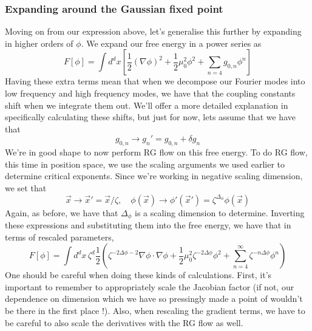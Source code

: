 \subsubsection{Expanding around the Gaussian fixed point}
Moving on from our expression above,
let's generalise this further by expanding 
in higher orders of $ \phi $. 
We expand our free energy in a power series as
 \[
	 F [ \phi ]  = \int d ^ d x \left[ \frac{1}{2 } ( \nabla \phi ) ^ 2 + 
	 \frac{1}{2 } \mu ^ 2 _ 0 \phi ^ 2 + \sum_{ n = 4 } g_{ 0 , n } \phi ^ n \right]  
\]  Having these
extra terms mean that when we decompose our 
Fourier modes into low frequency and 
high frequency modes, we have that 
the coupling constants shift when we integrate them out. 
We'll offer a more detailed explanation in 
specifically calculating these shifts, but just for now, 
lets assume that we have that 
\[
 g _{ 0 , n } \to g_{ n } ' = g _{ 0 , n } + \delta g _{ n }
\] We're in good shape to now 
perform RG flow on this free energy. To do RG flow, 
this time in position space, we use the scaling arguments 
we used earlier to determine critical exponents. 
Since we're working in negative scaling dimension, 
we set that 
\[
 \vec{x} \to \vec{x} ' = \vec{x}/\zeta, \quad 
 \phi( \vec{x} ) \to \phi ' ( \vec{x} ' )  = \zeta ^{ \Delta_ \phi  }
 \phi ( \vec{x} ) 
\] Again, as before, we have that 
$ \Delta _{ \phi } $ is a scaling 
dimension to determine. 
Inverting these expressions and substituting them into the free energy, we have that in terms of rescaled parameters, 
\[
 F [ \phi ] = 
 \int d ^ d x \, \zeta ^{ d } \frac{1}{2 } 
\left(  \zeta ^{ - 2 \Delta \phi - 2 } \nabla \phi \cdot  \nabla \phi + 
\frac{1}{2 } \mu _ 0 ^ 2 \zeta ^{ - 2 \Delta \phi  } \phi ^ 2 + 
\sum_{ n = 4 } ^ \infty \zeta ^{ - n \Delta \phi } \phi ^{ n } \right)  \] One should be careful 
when doing these kinds of calculations. 
First, it's important to remember to appropriately 
scale the Jacobian factor (if not, our dependence 
on dimension which we have so pressingly made a point of 
wouldn't be there in the first place  !). Also, when rescaling 
the gradient terms, we have to be careful to 
also scale the derivatives with the 
RG flow as well. 

